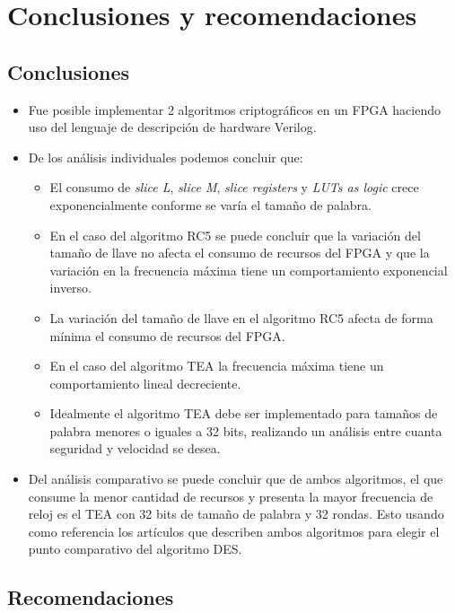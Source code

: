 \chapter{Conclusiones y recomendaciones}
\section*{Conclusiones}

\begin{itemize}
\item Fue posible implementar 2 algoritmos criptográficos en un FPGA haciendo uso del lenguaje de descripción de hardware Verilog.

\item De los análisis individuales podemos concluir que:
\begin{itemize}
\item El consumo de \textit{slice L}, \textit{slice M}, \textit{slice registers} y \textit{LUTs as logic} crece exponencialmente conforme se varía el tamaño de palabra.
\item En el caso del algoritmo RC5 se puede concluir que la variación del tamaño de llave no afecta el consumo de recursos del FPGA y que la variación en la frecuencia máxima tiene un comportamiento exponencial inverso.
\item La variación del tamaño de llave en el algoritmo RC5 afecta de forma mínima el consumo de recursos del FPGA.
\item En el caso del algoritmo TEA la frecuencia máxima tiene un comportamiento lineal decreciente.
\item Idealmente el algoritmo TEA debe ser implementado para tamaños de palabra menores o iguales a 32 bits, realizando un análisis entre cuanta seguridad y velocidad se desea.
\end{itemize}


\item Del análisis comparativo se puede concluir que de ambos algoritmos, el que consume la menor cantidad de recursos y presenta la mayor frecuencia de reloj es el TEA con 32 bits de tamaño de palabra y 32 rondas. Esto usando como referencia los artículos que describen ambos algoritmos para elegir el punto comparativo del algoritmo DES.
\end{itemize}

\section*{Recomendaciones}

